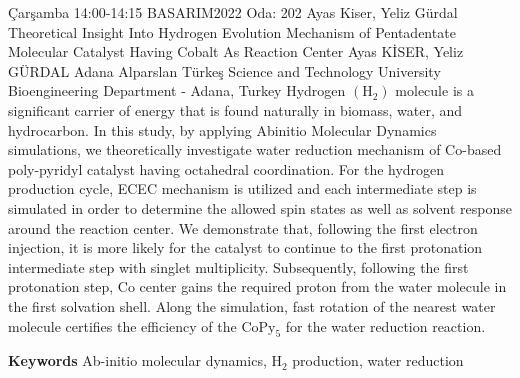 
    \begin{abstract_basarim}
    {Çarşamba 14:00-14:15}
    {BASARIM2022}
    {Oda: 202}
    {Ayas Kiser, Yeliz Gürdal}
    {Theoretical Insight Into Hydrogen Evolution Mechanism of Pentadentate Molecular Catalyst Having Cobalt As Reaction Center}
    {%
    Ayas KİSER, Yeliz GÜRDAL}
    {%
    }
    {%
    Adana Alparslan Türkeş Science and Technology University Bioengineering Department - Adana, Turkey}
    Hydrogen $\left(\mathrm{H}_{2}\right)$ molecule is a significant carrier of energy that is found naturally in biomass, water, and hydrocarbon. In this study, by applying Abinitio Molecular Dynamics simulations, we theoretically investigate water reduction mechanism of Co-based poly-pyridyl catalyst having octahedral coordination. For the hydrogen production cycle, ECEC mechanism is utilized and each intermediate step is simulated in order to determine the allowed spin states as well as solvent response around the reaction center. We demonstrate that, following the first electron injection, it is more likely for the catalyst to continue to the first protonation intermediate step with singlet multiplicity. Subsequently, following the first protonation step, Co center gains the required proton from the water molecule in the first solvation shell. Along the simulation, fast rotation of the nearest water molecule certifies the efficiency of the $\mathrm{CoPy}_{5}$ for the water reduction reaction. 
    
        \textbf{Keywords} \newline{}Ab-initio molecular dynamics, $\mathrm{H}_{2}$ production, water reduction
    \end{abstract_basarim}
    